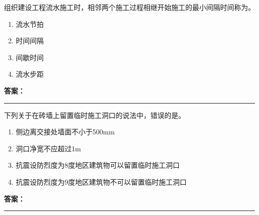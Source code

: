 \documentclass[UTF8,fontset=fandol,11pt]{ctexart}
\newcommand{\answerline}{\textcolor{answerred}{\rule{2.4cm}{0.7pt}}}
\begin{document}
\begin{quizbox}[title={乱序第 129 题｜第十章流水施工原理}]

组织建设工程流水施工时，相邻两个施工过程相继开始施工的最小间隔时间称为。\\

\begin{enumerate}[label=\Alph*.]

\item 流水节拍

\item 时间间隔

\item 间歇时间

\item 流水步距

\end{enumerate}

\textbf{\textcolor{answerred}{答案：}} \answerline

\end{quizbox}

\vspace{0.2em}

\begin{quizbox}[title={乱序第 130 题｜第六章砌筑工程}]

下列关于在砖墙上留置临时施工洞口的说法中，错误的是。\\

\begin{enumerate}[label=\Alph*.]

\item 侧边离交接处墙面不小于500mm

\item 洞口净宽不应超过1m

\item 抗震设防烈度为8度地区建筑物可以留置临时施工洞口

\item 抗震设防烈度为9度地区建筑物不可以留置临时施工洞口

\end{enumerate}

\textbf{\textcolor{answerred}{答案：}} \answerline

\end{quizbox}

\vspace{0.2em}
\end{document}
